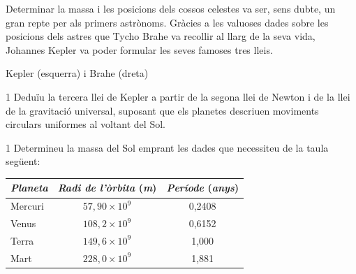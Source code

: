 Determinar la massa i les posicions dels cossos celestes va ser, sens dubte, un gran repte per als primers astrònoms. Gràcies a les valuoses dades sobre les posicions dels astres que Tycho Brahe va recollir al llarg de la seva vida, Johannes Kepler va poder formular les seves famoses tres lleis.

{\centering Kepler (esquerra) i Brahe (dreta)\par}

\begin{apartat}{1}
Deduïu la tercera llei de Kepler a partir de la segona llei de Newton i de la llei de la gravitació universal, suposant que els planetes descriuen moviments circulars uniformes al voltant del Sol.
\end{apartat}

\begin{apartat}{1}
Determineu la massa del Sol emprant les dades que necessiteu de la taula següent:

\smallskip
\begin{tabular}{|l|c|c|}
\hline
\textit{Planeta} & \textit{Radi de l'òrbita} (\textit{m}) & \textit{Període} (\textit{anys})\\
\hline
Mercuri & $57,90\times 10^{9}$ & 0,2408\\
\hline
Venus & $108,2\times 10^{9}$ & 0,6152\\
\hline
Terra & $149,6\times 10^{9}$ & 1,000\\
\hline
Mart & $228,0\times 10^{9}$ & 1,881\\
\hline
\end{tabular}
\end{apartat}

